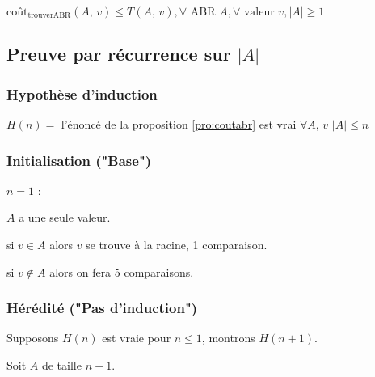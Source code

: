 $\text{coût}_{\text{trouverABR}}(A,\, v) \leq T(A,\, v),
\forall \text{ ABR } A, \forall \text{ valeur } v, \vert A \vert \geq 1$

\subsection{Preuve par récurrence sur $\vert A \vert$}

\subsubsection*{Hypothèse d'induction}

$H(n) = $ l'énoncé de la proposition \ref{pro:coutabr} est vrai $\forall A,\, v$ $\vert A \vert \leq n$

\subsubsection*{Initialisation ("Base")}

$n = 1$ : \begin{minipage}[t]{\textwidth} $A$ a une seule valeur.

si $v \in A$ alors $v$ se trouve à la racine, \textcolor{ocre}{1 comparaison}.

si $v \notin A$ alors on fera \textcolor{ocre}{5 comparaisons}.

\end{minipage}

\subsubsection*{Hérédité ("Pas d'induction")}

Supposons $H(n)$ est vraie pour $n \leq 1$, montrons $H(n + 1)$.

Soit $A$ de taille $n + 1$.

